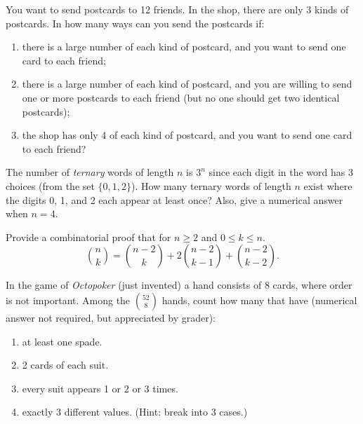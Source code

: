 \documentclass[12pt,letterpaper]{hmcpset}
\begin{document}
\begin{problem}[6]
    You want to send postcards to 12 friends. In the shop, there are only 3 kinds of postcards. In how many ways can you send the postcards if:
    \begin{enumerate}
        \item there is a large number of each kind of postcard, and you want to send one card to each friend;
        \item there is a large number of each kind of postcard, and you are willing to send one or more postcards to each friend (but no one should get two identical postcards);
        \item the shop has only 4 of each kind of postcard, and you want to send one card to each friend?
    \end{enumerate}
\end{problem}
\begin{solution}
    \vfill
\end{solution}
\newpage

\begin{problem}[7]
    The number of \textit{ternary} words of length $n$ is $3^n$ since each digit in the word has 3 choices (from the set $\{0,1,2\}$). How many ternary words of length $n$ exist where the digits 0, 1, and 2 each appear at least once? Also, give a numerical answer when $n=4$.
\end{problem}
\begin{solution}
    \vfill
\end{solution}
\newpage

\begin{problem}[8]
    Provide a combinatorial proof that for $n\geq2$ and $0\leq k\leq n$.
    \[
        \binom{n}{k}=\binom{n-2}{k}+2\binom{n-2}{k-1}+\binom{n-2}{k-2}.
    \]
\end{problem}
\begin{solution}
    \vfill
\end{solution}
\newpage

\begin{problem}[9]
    In the game of \textit{Octopoker} (just invented) a hand consists of 8 cards, where order is not important. Among the $\displaystyle\binom{52}{8}$ hands, count how many that have (numerical answer not required, but appreciated by grader):
    \begin{enumerate}
        \item at least one spade.
        \item 2 cards of each suit.
        \item every suit appears 1 or 2 or 3 times.
        \item exactly 3 different values. (Hint: break into 3 cases.)
    \end{enumerate}
\end{problem}
\begin{solution}
    \vfill
\end{solution}
\end{document}
